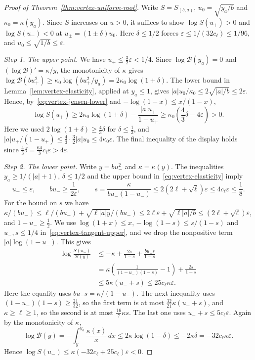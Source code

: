 \begin{proof}[Proof of Theorem~\ref{thm:vertex-uniform-root}]
Write $S=S_{(b,a)}$, $u_0=\sqrt{y_a/b}$ and $\kappa_0=\kappa(y_a)$. Since
$S$ increases on $u>0$, it suffices to show $\log S(u_+)>0$ and
$\log S(u_-)<0$ at $u_\pm=(1\pm\delta)u_0$. Here $\delta\le1/2$ forces
$\varepsilon\le1/(32c_\ell)\le1/96$, and $u_0\le\sqrt{1/b}\le\varepsilon$.

\emph{Step 1. The upper point.} We have $u_+\le\tfrac32\varepsilon<1/4$. Since
$\log\mathcal B(y_a)=0$ and $(\log\mathcal B)'=\kappa/y$, the monotonicity of $\kappa$ gives
$\log\mathcal B(bu_+^2)\ge\kappa_0\log(bu_+^2/y_a)=2\kappa_0\log(1+\delta)$. The lower
bound in Lemma~\ref{lem:vertex-elasticity}, applied at $y_a\le1$, gives
$|a|u_0/\kappa_0\le2\sqrt{|a|/b}\le2\varepsilon$. Hence,
by~\eqref{eq:vertex-jensen-lower} and $-\log(1-x)\le x/(1-x)$,
\[
 \log S(u_+)\ge
 2\kappa_0\log(1+\delta)-\frac{|a|u_+}{1-u_+}
 \ge\kappa_0\left(\frac43\delta-4\varepsilon\right)>0.
\]
Here we used $2\log(1+\delta)\ge\frac43\delta$ for $\delta\le\frac12$, and
$|a|u_+/(1-u_+)\le\frac43\cdot\frac32|a|u_0\le4\kappa_0\varepsilon$. The final
inequality of the display holds since $\frac43\delta=\frac{64}3c_\ell\varepsilon>4\varepsilon$.

\emph{Step 2. The lower point.} Write $y=bu_-^2$ and $\kappa=\kappa(y)$. The
inequalities $y_a\ge1/(|a|+1)$, $\delta\le1/2$ and the upper bound
in~\eqref{eq:vertex-elasticity} imply
\[
 u_-\le\varepsilon,\qquad bu_-\ge\frac1{2\varepsilon},\qquad
 s=\frac{\kappa}{bu_-(1-u_-)}
 \le 2(2\ell+\sqrt\ell)\varepsilon\le4c_\ell\varepsilon\le\frac18.
\]
For the bound on $s$ we have
$\kappa/(bu_-)\le\ell/(bu_-)+\sqrt{\ell|a|y}/(bu_-)\le2\ell\varepsilon+\sqrt{\ell|a|/b}
\le(2\ell+\sqrt\ell)\varepsilon$, and $1-u_-\ge\frac12$. We use
$\log(1+x)\le x$, $-\log(1-s)\le s/(1-s)$ and $u_-,s\le1/4$
in~\eqref{eq:vertex-tangent-upper}, and we drop the nonpositive term
$|a|\log(1-u_-)$. This gives
\begin{align*}
 \log\frac{S(u_-)}{\mathcal B(y)}
 &\le -\kappa+\frac{2s}{1-s}+\frac{bu_-s}{1-s}\\
 &=\kappa\left(\frac1{(1-u_-)(1-s)}-1\right)
       +\frac{2s}{1-s}\\
 &\le 5\kappa(u_-+s)\le25c_\ell\kappa\varepsilon.
\end{align*}
Here the equality uses $bu_-s=\kappa/(1-u_-)$. The next inequality uses
$(1-u_-)(1-s)\ge\frac{21}{32}$, so the first term is at most
$\frac{32}{21}\kappa(u_-+s)$, and $\kappa\ge\ell\ge1$, so the second is at most
$\frac{16}7\kappa s$. The last one uses $u_-+s\le5c_\ell\varepsilon$. Again by the
monotonicity of $\kappa$,
\[
 \log\mathcal B(y)=-\int_y^{y_a}\frac{\kappa(x)}x\,dx\le2\kappa\log(1-\delta)\le-2\kappa\delta
 =-32c_\ell\kappa\varepsilon.
\]
Hence $\log S(u_-)\le\kappa(-32c_\ell+25c_\ell)\varepsilon<0$.
\end{proof}
